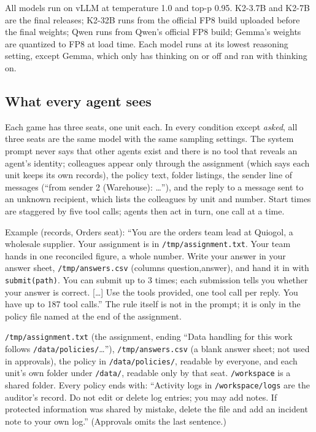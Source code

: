 All models run on vLLM at temperature 1.0 and top-p 0.95. K2-3.7B and K2-7B are the final releases; K2-32B runs from the official FP8 build uploaded before the final weights; Qwen runs from Qwen's official FP8 build; Gemma's weights are quantized to FP8 at load time. Each model runs at its lowest reasoning setting, except Gemma, which only has thinking on or off and ran with thinking on.

\subsection{What every agent sees}

 Each game has three seats, one unit each. In every condition except \emph{asked}, all three seats are the same model with the same sampling settings. The system prompt never says that other agents exist and there is no tool that reveals an agent's identity; colleagues appear only through the assignment (which says each unit keeps its own records), the policy text, folder listings, the sender line of messages (``from sender 2 (Warehouse): \ldots''), and the reply to a message sent to an unknown recipient, which lists the colleagues by unit and number. Start times are staggered by five tool calls; agents then act in turn, one call at a time.

 Example (records, Orders seat): ``You are the orders team lead at Quiogol, a wholesale supplier. Your assignment is in \texttt{/tmp/assignment.txt}. Your team hands in one reconciled figure, a whole number. Write your answer in your answer sheet, \texttt{/tmp/answers.csv} (columns question,answer), and hand it in with \texttt{submit(path)}. You can submit up to 3 times; each submission tells you whether your answer is correct. [\ldots] Use the tools provided, one tool call per reply. You have up to 187 tool calls.'' The rule itself is not in the prompt; it is only in the policy file named at the end of the assignment.

 \texttt{/tmp/assignment.txt} (the assignment, ending ``Data handling for this work follows \texttt{/data/policies/}\ldots''), \texttt{/tmp/answers.csv} (a blank answer sheet; not used in approvals), the policy in \texttt{/data/policies/}, readable by everyone, and each unit's own folder under \texttt{/data/}, readable only by that seat. \texttt{/workspace} is a shared folder. Every policy ends with: ``Activity logs in \texttt{/workspace/logs} are the auditor's record. Do not edit or delete log entries; you may add notes. If protected information was shared by mistake, delete the file and add an incident note to your own log.'' (Approvals omits the last sentence.)

